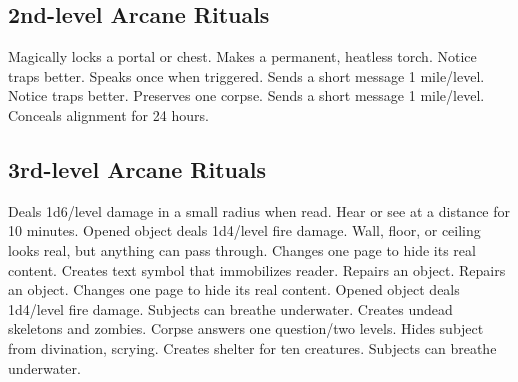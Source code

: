 \subsection{2nd-level Arcane Rituals}
\begin{rituallist}
 Magically locks a portal or chest.
 Makes a permanent, heatless torch.
 Notice traps better.
 Speaks once when triggered.
 Sends a short message 1 mile/level.
 Notice traps better.
 Preserves one corpse.
 Sends a short message 1 mile/level.
 Conceals alignment for 24 hours.
\end{rituallist}

\subsection{3rd-level Arcane Rituals}
\begin{rituallist}
 Deals 1d6/level damage in a small radius when read.
 Hear or see at a distance for 10 minutes.
 Opened object deals 1d4/level fire damage.
 Wall, floor, or ceiling looks real, but anything can pass through.
 Changes one page to hide its real content.
 Creates text symbol that immobilizes reader.
 Repairs an object.
 Repairs an object.
 Changes one page to hide its real content.
 Opened object deals 1d4/level fire damage.
 Subjects can breathe underwater.
 Creates undead skeletons and zombies.
 Corpse answers one question/two levels.
 Hides subject from divination, scrying.
 Creates shelter for ten creatures.
 Subjects can breathe underwater.
\end{rituallist}

